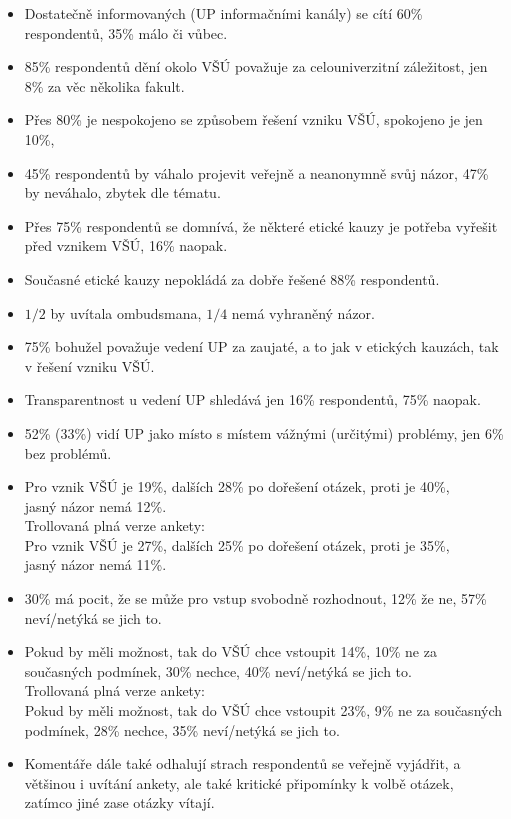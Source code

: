 \documentclass[a4paper,twoside]{article}
\begin{document}
\begin{itemize}
  \item Dostatečně informovaných (UP informačními kanály) se cítí 60\% respondentů, 35\% málo či vůbec.
  \item 85\% respondentů  dění okolo VŠÚ považuje za celouniverzitní záležitost, jen 8\% za věc několika fakult.
  \item Přes 80\% je nespokojeno se způsobem řešení vzniku VŠÚ, spokojeno je jen 10\%, 
  \item 45\% respondentů by váhalo projevit veřejně a neanonymně svůj názor, 47\% by neváhalo, zbytek dle tématu.
  \item Přes 75\% respondentů se domnívá, že některé etické kauzy je potřeba vyřešit před vznikem VŠÚ, 16\% naopak.
  \item Současné etické kauzy nepokládá za dobře řešené 88\% respondentů.
  \item $1/2$ by uvítala ombudsmana, $1/4$ nemá vyhraněný názor.
  \item 75\% bohužel považuje vedení UP za zaujaté, a to jak v etických kauzách, tak v řešení vzniku VŠÚ.
  \item Transparentnost u vedení UP shledává jen 16\% respondentů, 75\% naopak.
  \item 52\% (33\%) vidí UP jako místo s místem vážnými (určitými) problémy, jen 6\% bez problémů.
  \item Pro vznik VŠÚ je 19\%, dalších 28\% po dořešení otázek, proti je 40\%, \\ jasný názor nemá 12\%.
    \\ Trollovaná plná verze ankety:
    \\ Pro vznik VŠÚ je 27\%, dalších 25\% po dořešení otázek, proti je 35\%, \\ jasný názor nemá 11\%.
  \item 30\% má pocit, že se může pro vstup svobodně rozhodnout, 12\% že ne, 57\% neví/netýká se jich to.
  \item Pokud by měli možnost, tak do VŠÚ chce vstoupit 14\%, 10\% ne za současných podmínek, 30\% nechce, 40\% neví/netýká se jich to.
    \\ Trollovaná plná verze ankety:
    \\ Pokud by měli možnost, tak do VŠÚ chce vstoupit 23\%, 9\% ne za současných podmínek, 28\% nechce, 35\% neví/netýká se jich to.
  \item Komentáře dále také odhalují strach respondentů se veřejně vyjádřit, a většinou i uvítání ankety, ale také kritické připomínky k volbě otázek, zatímco jiné zase otázky vítají.
\end{itemize}
\end{document}

